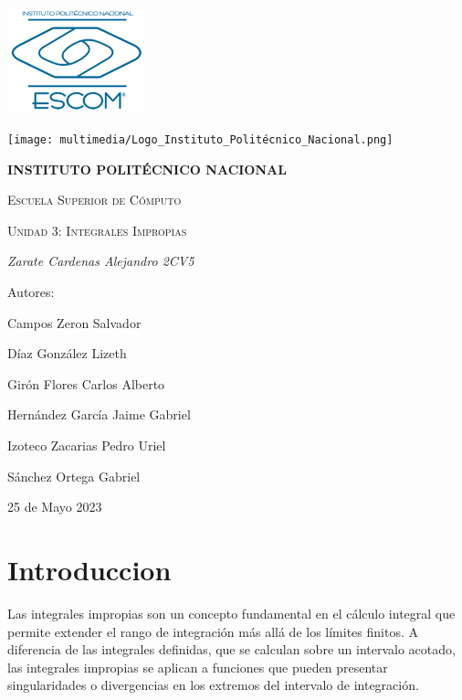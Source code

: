 \documentclass{article}
\begin{document}
\begin{titlepage}
    {\includegraphics[width=0.3\textwidth]{multimedia/ESCOM-Logo.png}}
    \hfill
    {\texttt{[image: multimedia/Logo\_Instituto\_Politécnico\_Nacional.png]}\par}
    \vspace{1cm}
    \centering
    {\bfseries\LARGE  INSTITUTO POLIT\'ECNICO NACIONAL\par}
    \vspace{1cm}
    {\scshape\LARGE Escuela Superior de C\'omputo\par}
    \vspace{1cm}
    {\scshape\Huge Unidad 3: Integrales Impropias \par}
    \vspace{2cm}
    {\itshape\Large Zarate Cardenas Alejandro 2CV5\par}
    \vfill
    {\Large Autores:\par}
    {\Large Campos Zeron Salvador\par}
    {\Large Díaz González Lizeth\par}
    {\Large Girón Flores Carlos Alberto\par}
    {\Large Hernández García Jaime Gabriel\par}
    {\Large Izoteco Zacarias Pedro Uriel\par}
    {\Large S\'anchez Ortega Gabriel\par}
    \vfill
    {\Large 25 de Mayo 2023 \par}
\end{titlepage}

\renewcommand*\contentsname{Indice}
\tableofcontents
\newpage

\section{Introduccion}

Las integrales impropias son un concepto fundamental en el cálculo integral que permite extender el rango de integración más allá de los límites finitos. A diferencia de las integrales definidas, que se calculan sobre un intervalo acotado, las integrales impropias se aplican a funciones que pueden presentar singularidades o divergencias en los extremos del intervalo de integración.
\end{document}
